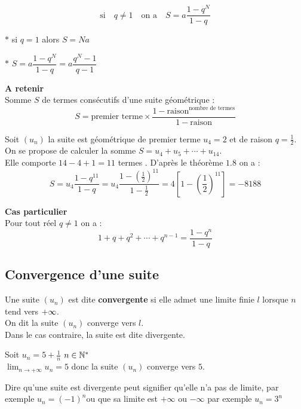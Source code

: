   \[ \textrm{si}\quad  q\neq 1\quad \textrm{on a} \quad S = a\dfrac{1-q^{N}}{1-q} \]
 \begin{remark}
$ \ast $ si $ q = 1 $ alors $ S=Na $
 
 $ \ast $  $ S = a\dfrac{1-q^{N}}{1-q}= a\dfrac{q^{N}-1}{q-1} $
   
    \end{remark}
   \textbf{A retenir} \\
 Somme  $ S $ de termes consécutifs d'une suite géométrique :  
   \[  S=\text{premier terme}\times\dfrac{1-\text{raison}^{\text{nombre de termes}}}{1-\text{raison}}\]
\begin{example}
 Soit $(u_{n})$ la  suite est géométrique  de premier terme $u_{4}= 2$ et de raison $ q= \frac{1}{2}$.\\ On se propose de calculer la somme  $ S=u_{4}+u_{5}+\cdots +u_{14}$. \\
 Elle comporte $ 14-4+1 =11$ termes  . D'après le théorème $ 1.8 $ on a :
$$ S=u_{4}\dfrac{1-q^{11}}{1-q} =u_{4}\dfrac{1-(\frac{1}{2})^{11}}{1-\frac{1}{2}}= 4[1-(\frac{1}{2})^{11}]= -8188$$
\end{example}
 \textbf{\color{blue}Cas particulier} \\Pour tout réel $ q\neq 1 $	on a :
 \[ 1+q+q^{2}+\cdots+ q^{n-1}=\dfrac{1-q^{n}}{1-q}\]

\subsection{Convergence d'une suite}
 \begin{definition}
  Une suite $(u_{n})$  est dite  \textbf{ convergente} si elle admet une limite finie $ l $ lorsque $ n $ tend vers  $ +\infty $. \\
  On dit la suite $(u_{n})$  converge vers $ l $.\\
  Dans le cas contraire, la suite est dite divergente.
  \end{definition}
\begin{example}
 Soit $ u_{n}=5+\frac{1}{n} $ \quad $ n\in\mathbb{N}^* $ \\
 $ \displaystyle \lim_{n \to  +\infty} u_{n}=5$ \quad donc la suite $(u_{n})$  converge vers $ 5 $.
 \end{example}
 \begin{remark}  Dire qu'une suite est divergente peut signifier qu'elle n'a pas de limite, par exemple $ u_{n}=(-1)^{n} $ou que sa limite est $+\infty $ ou $-\infty $ par exemple $ u_{n}=3^{n} $
 \end{remark}
